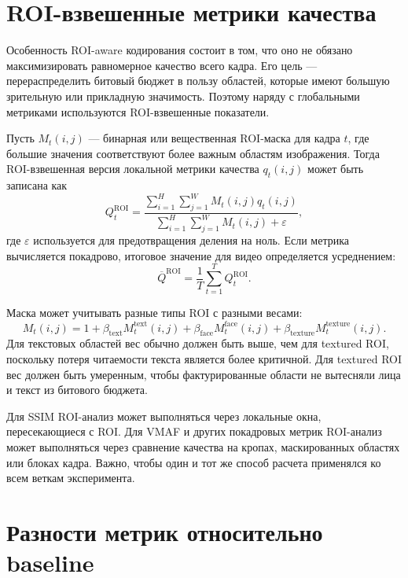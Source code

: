 \documentclass[12pt,a4paper,oneside,openany]{report}
\begin{document}
\section{ROI-взвешенные метрики качества}

Особенность ROI-aware кодирования состоит в том, что оно не обязано максимизировать равномерное качество всего кадра. Его цель --- перераспределить битовый бюджет в пользу областей, которые имеют большую зрительную или прикладную значимость. Поэтому наряду с глобальными метриками используются ROI-взвешенные показатели.

Пусть $M_t(i,j)$ --- бинарная или вещественная ROI-маска для кадра $t$, где большие значения соответствуют более важным областям изображения. Тогда ROI-взвешенная версия локальной метрики качества $q_t(i,j)$ может быть записана как
\begin{equation}Q^{\operatorname{ROI}}_t =\frac{\sum_{i=1}^{H}\sum_{j=1}^{W}M_t(i,j)q_t(i,j)}{\sum_{i=1}^{H}\sum_{j=1}^{W}M_t(i,j)+\varepsilon},\label{eq:video_roi_weighted_metric}
\end{equation}где $\varepsilon$ используется для предотвращения деления на ноль. Если метрика вычисляется покадрово, итоговое значение для видео определяется усреднением:
\begin{equation}\overline{Q}^{\operatorname{ROI}}=\frac{1}{T}\sum_{t=1}^{T}Q^{\operatorname{ROI}}_t.\label{eq:video_roi_weighted_avg}
\end{equation}

Маска может учитывать разные типы ROI с разными весами:
\begin{equation}M_t(i,j)=1+\beta_{\mathrm{text}}M^{\mathrm{text}}_t(i,j)+\beta_{\mathrm{face}}M^{\mathrm{face}}_t(i,j)+\beta_{\mathrm{texture}}M^{\mathrm{texture}}_t(i,j).\label{eq:video_roi_mask}
\end{equation}Для текстовых областей вес обычно должен быть выше, чем для textured ROI, поскольку потеря читаемости текста является более критичной. Для textured ROI вес должен быть умеренным, чтобы фактурированные области не вытесняли лица и текст из битового бюджета.

Для SSIM ROI-анализ может выполняться через локальные окна, пересекающиеся с ROI. Для VMAF и других покадровых метрик ROI-анализ может выполняться через сравнение качества на кропах, маскированных областях или блоках кадра. Важно, чтобы один и тот же способ расчета применялся ко всем веткам эксперимента.

\section{Разности метрик относительно baseline}
\end{document}
